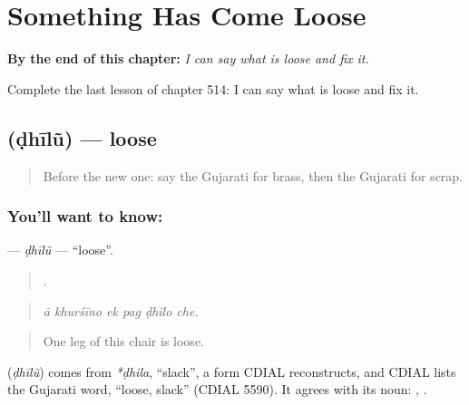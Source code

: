 
\chapter{Something Has Come Loose}
\label{ch:gu-something-has-come-loose}

\begin{chapteropening}
\textbf{By the end of this chapter:} \emph{I can say what is loose and fix it.}

Complete the last lesson of chapter 514: I can say what is loose and fix it.
\end{chapteropening}

\section[\texorpdfstring{\gu{ઢીલું} (ḍhīlũ)}{ઢીલું (ḍhīlũ)}]{ (ḍhīlũ) — loose}

\label{lesson:GU-C514-dhilu}



\begin{quote}
Before the new one: say the Gujarati for brass, then the Gujarati for scrap.
\end{quote}

\subsection*{You'll want to know: }
\textbf{} — \emph{ḍhīlũ} — \textquotedblleft{}loose\textquotedblright{}.

\begin{quote}
     .
\end{quote}

\begin{quote}
\emph{ā khurśīno ek pag ḍhīlo che.}
\end{quote}

\begin{quote}
One leg of this chair is loose.
\end{quote}

\begin{cousinweb}
\textbf{} (\emph{ḍhīlũ}) comes from \emph{*ḍhila}, \textquotedblleft{}slack\textquotedblright{}, a form CDIAL reconstructs, and CDIAL lists the Gujarati word, \textquotedblleft{}loose, slack\textquotedblright{} (CDIAL 5590). It agrees with its noun: \textbf{ }, \textbf{ }.
\end{cousinweb}

